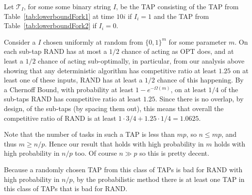 Let $\mathcal{T}_{I}$, for some some binary string $I$, be the
TAP consisting of the TAP from Table~\ref{tab:lowerboundFork1} at
time $10i$ if $I_i = 1$ and the TAP from
Table~\ref{tab:lowerboundFork2} if $I_i = 0$. 

Consider a $I$ chosen uniformly at random from $\{0,1\}^m$ for
some parameter $m$.
On each sub-tap RAND has at most a $1/2$ chance of acting as OPT
does, and at least a $1/2$ chance of acting sub-optimally, in
particular, from our analysis above showing that any deterministic
algorithm has competitive ratio at least $1.25$ on at least one
of these inputs, RAND has at least a $1/2$ chance of this
happening.
By a Chernoff Bound, with probability at least
$1-e^{-\Omega(m)}$, on at least $1/4$ of the sub-taps RAND has
competitive ratio at least $1.25$. Since there is no overlap, by
design, of the sub-taps (by spacing them out), this means that
overall the competitive ratio of RAND is at least $1\cdot 3/4 +
1.25 \cdot 1/4 = 1.0625.$

Note that the number of tasks in such a TAP is less than $mp$, so
$n \le mp$, and thus $m \ge n/p$.
Hence our result that holds with high probability in $m$ holds
with high probability in $n/p$ too.
Of course $n\gg p$ so this is pretty decent.

Because a randomly chosen TAP from this class of TAPs is bad for
RAND with high probability in $n/p$, by the probabilistic method
there is at least one TAP in this class of TAPs that is bad for
RAND. 



